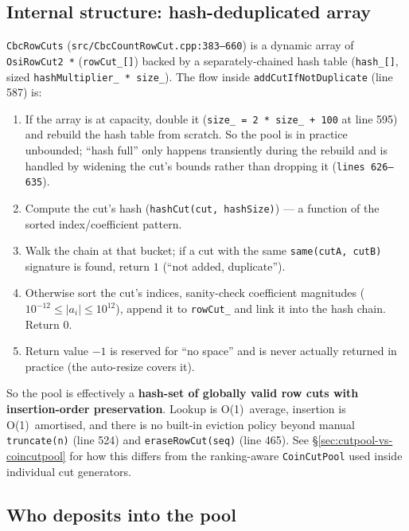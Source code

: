 \documentclass[11pt,a4paper]{article}
\begin{document}
\subsection*{Internal structure: hash-deduplicated array}

\texttt{CbcRowCuts} (\texttt{src/CbcCountRowCut.cpp:383--660}) is a
dynamic array of \texttt{OsiRowCut2 *} (\texttt{rowCut\_[]}) backed
by a separately-chained hash table (\texttt{hash\_[]}, sized
\texttt{hashMultiplier\_ * size\_}).  The flow inside
\texttt{addCutIfNotDuplicate} (line 587) is:

\begin{enumerate}[leftmargin=*]
  \item If the array is at capacity, double it
        (\texttt{size\_ = 2 * size\_ + 100} at line 595) and
        rebuild the hash table from scratch.  So the pool is in
        practice unbounded; ``hash full'' only happens transiently
        during the rebuild and is handled by widening the cut's
        bounds rather than dropping it (\texttt{lines 626--635}).
  \item Compute the cut's hash (\texttt{hashCut(cut, hashSize)}) ---
        a function of the sorted index/coefficient pattern.
  \item Walk the chain at that bucket; if a cut with the same
        \texttt{same(cutA, cutB)} signature is found,
        return $1$ (``not added, duplicate'').
  \item Otherwise sort the cut's indices, sanity-check coefficient
        magnitudes ($10^{-12} \le |a_i| \le 10^{12}$), append it to
        \texttt{rowCut\_} and link it into the hash chain.  Return $0$.
  \item Return value $-1$ is reserved for ``no space'' and is never
        actually returned in practice (the auto-resize covers it).
\end{enumerate}

So the pool is effectively a \textbf{hash-set of globally valid row
cuts with insertion-order preservation}.  Lookup is O(1)~average,
insertion is O(1)~amortised, and there is no built-in eviction
policy beyond manual \texttt{truncate(n)} (line 524) and
\texttt{eraseRowCut(seq)} (line 465).  See
\S\ref{sec:cutpool-vs-coincutpool} for how this differs from the
ranking-aware \texttt{CoinCutPool} used inside individual cut
generators.

\subsection*{Who deposits into the pool}
\end{document}
